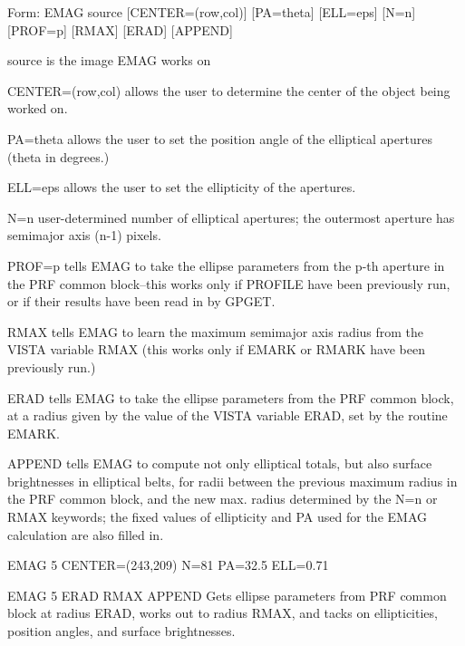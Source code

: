 {\newpage\clearpage
{}%
\begin{command}
  \item[Form: EMAG source {[CENTER=(row,col)]} {[PA=theta]} {[ELL=eps]} {[N=n]}
     {[PROF=p]} {[RMAX]} {[ERAD]} {[APPEND]}\hfill]{}
  \item[source]{is the image EMAG works on}
  \item[CENTER=(row,col)]{allows the user to determine the center
       of the object being worked on.}
  \item[PA=theta]{allows the user to set the position angle of
       the elliptical apertures (theta in degrees.)}
  \item[ELL=eps]{allows the user to set the ellipticity of the
       apertures.}
  \item[N=n]{user-determined number of elliptical apertures;
       the outermost aperture has semimajor axis (n-1) pixels.}
  \item[PROF=p]{tells EMAG to take the ellipse parameters from the p-th
       aperture in the PRF common block--this works only if PROFILE have
       been previously run, or if their results have been read in by
       GPGET.}
  \item[RMAX]{tells EMAG to learn the maximum semimajor axis radius from
       the VISTA variable RMAX (this works only if EMARK or RMARK have been
       previously run.)}
  \item[ERAD]{tells EMAG to take the ellipse parameters from the PRF common
       block, at a radius given by the value of the VISTA variable ERAD,
       set by the routine EMARK.}
  \item[APPEND]{tells EMAG to compute not only elliptical totals, but also
       surface brightnesses in elliptical belts, for radii between the
       previous maximum radius in the PRF common block, and the new
       max. radius determined by the N=n or RMAX keywords; the fixed values
       of ellipticity and PA used for the EMAG calculation are also filled
       in.}
\end{command}%
\lthtmlfigureZ
\lthtmlcheckvsize\clearpage}

{\newpage\clearpage
{}%
\begin{example}
  \item[EMAG 5 CENTER=(243,209) N=81 PA=32.5 ELL=0.71\hfill]{}
\par\item[EMAG 5 ERAD RMAX APPEND\hfill]{Gets ellipse parameters from PRF
       common block at radius ERAD, works out to radius RMAX, and tacks on
       ellipticities, position angles, and surface brightnesses.}
\end{example}%
\lthtmlfigureZ
\lthtmlcheckvsize\clearpage}

